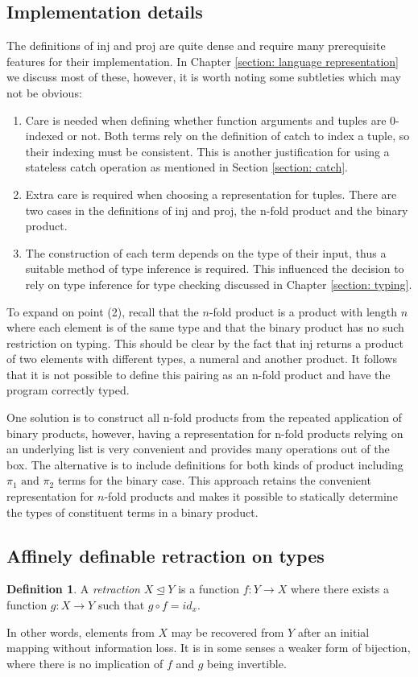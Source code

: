 \documentclass[12pt,a4paper]{report}
\theoremstyle{definition}
\theoremstyle{definition}
\newtheorem{definition}{Definition}[chapter]%
\theoremstyle{remark}
\begin{document}
\subsection{Implementation details}
The definitions of inj and proj are quite dense and require many prerequisite features for their implementation. In Chapter \ref{section: language representation} we discuss most of these, however, it is worth noting some subtleties which may not be obvious:
\begin{enumerate}
    \item Care is needed when defining whether function arguments and tuples are 0-indexed or not. Both terms rely on the definition of catch to index a tuple, so their indexing must be consistent. This is another justification for using a stateless catch operation as mentioned in Section \ref{section: catch}.
    \item Extra care is required when choosing a representation for tuples. There are two cases in the definitions of inj and proj, the n-fold product and the binary product. 
    \item The construction of each term depends on the type of their input, thus a suitable method of type inference is required. This influenced the decision to rely on type inference for type checking discussed in Chapter \ref{section: typing}.
\end{enumerate}

To expand on point (2), recall that the $n$-fold product is a product with length $n$ where each element is of the same type and that the binary product has no such restriction on typing. This should be clear by the fact that inj returns a product of two elements with different types, a numeral and another product. It follows that it is not possible to define this pairing as an n-fold product and have the program correctly typed.

One solution is to construct all n-fold products from the repeated application of binary products, however, having a representation for n-fold products relying on an underlying list is very convenient and provides many operations out of the box. The alternative is to include definitions for both kinds of product including $\pi_1 \text{ and } \pi_2$ terms for the binary case. This approach retains the convenient representation for $n$-fold products and makes it possible to statically determine the types of constituent terms in a binary product.

\subsection{Affinely definable retraction on types}
\begin{definition}
    A \emph{retraction} $X \trianglelefteq Y$ is a function $f: Y \rightarrow X$ where there exists a function $g: X \rightarrow Y$ such that $g \circ f = id_x$. 
    
    In other words, elements from $X$ may be recovered from $Y$ after an initial mapping without information loss. It is in some senses a weaker form of bijection, where there is no implication of $f$ and $g$ being invertible.
\end{definition}
\end{document}
